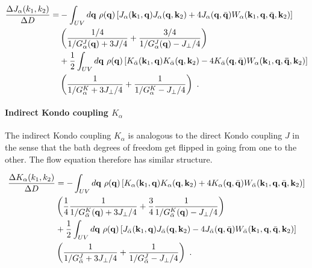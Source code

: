 \documentclass[%
reprint,
superscriptaddress,
groupedaddress,
superscriptaddress,
onecolumn,
10pt
]{revtex4-2}
\begin{document}
\begin{equation}\begin{aligned}
	\frac{\Delta J_\alpha(k_1, k_2)}{\Delta D} =& -\int_{UV} d{\bf q} ~\rho({\bf q}) \left[J_\alpha({\bf k}_1, {\bf q})J_\alpha({\bf q}, {\bf k}_2) + 4J_\alpha({\bf q}, \bar {\bf q})W_\alpha({\bf k}_1, {\bf q}, \bar {\bf q}, {\bf k}_2)\right]\\
	&\left(\frac{1/4}{1/G_\alpha^J({\bf q}) + 3J/4} + \frac{3/4}{1/G_\alpha^J({\bf q}) - J_\perp/4}\right)\\
	&+ \frac{1}{2}\int_{UV} d{\bf q} ~\rho({\bf q}) \left[K_{\bar\alpha}({\bf k}_1, {\bf q})K_{\bar\alpha}({\bf q}, {\bf k}_2) - 4K_{\bar\alpha}({\bf q}, \bar {\bf q})W_{\alpha}({\bf k}_1, {\bf q},  {\bf \bar q}, {\bf k}_2)\right]\\
	&\left(\frac{1}{1/ G_{\alpha}^K + 3J_\perp/4}+ \frac{1}{1/ G_{\alpha}^K - J_\perp/4}\right)~.
\end{aligned}\end{equation}

\paragraph{Indirect Kondo coupling \(K_\alpha\)}
The indirect Kondo coupling \(K_\alpha\) is analogous to the direct Kondo coupling \(J\) in the sense that the bath degrees of freedom get flipped in going from one to the other. The flow equation therefore has similar structure.

\begin{equation}\begin{aligned}
	\frac{\Delta K_\alpha(k_1, k_2)}{\Delta D} &= -\int_{UV} d{\bf q} ~\rho({\bf q}) \left[K_\alpha({\bf k}_1, {\bf q})K_\alpha({\bf q}, {\bf k}_2) + 4K_\alpha({\bf q}, \bar {\bf q})W_{\bar\alpha}({\bf k}_1, {\bf q}, \bar {\bf q}, {\bf k}_2)\right]\\
											   &\left(\frac{1}{4}\frac{1}{1/ G_{\bar\alpha}^K({\bf q}) + 3J_\perp/4} + \frac{3}{4}\frac{1}{1/ G_{\bar\alpha}^K({\bf q}) - J_\perp/4}\right)\\
	&+ \frac{1}{2}\int_{UV} d{\bf q} ~\rho({\bf q}) \left[J_{\bar\alpha}({\bf k}_1, {\bf q})J_{\bar\alpha}({\bf q}, {\bf k}_2) - 4J_{\bar\alpha}({\bf q}, \bar {\bf q})W_{\bar\alpha}({\bf k}_1, {\bf q}, \bar {\bf q}, {\bf k}_2)\right]\\
	&\left(\frac{1}{1/G_{\bar\alpha}^J + 3J_\perp/4} + \frac{1}{1/G_{\bar\alpha}^J - J_\perp/4}\right)~.
\end{aligned}\end{equation}
\end{document}
